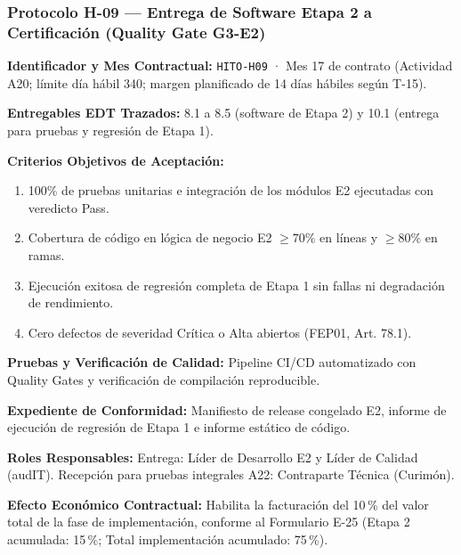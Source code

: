 \subsubsection*{Protocolo H-09 — Entrega de Software Etapa 2 a Certificación (Quality Gate G3-E2)}\label{sec:9-proto-h9}
\par\noindent\textbf{Identificador y Mes Contractual:} \texttt{HITO-H09} · Mes 17 de contrato (Actividad A20; límite día hábil 340; margen planificado de 14 días hábiles según T-15).\par
\par\noindent\textbf{Entregables EDT Trazados:} 8.1 a 8.5 (software de Etapa 2) y 10.1 (entrega para pruebas y regresión de Etapa 1).\par
\par\noindent\textbf{Criterios Objetivos de Aceptación:}
\begin{enumerate}
  \item 100\% de pruebas unitarias e integración de los módulos E2 ejecutadas con veredicto Pass.
  \item Cobertura de código en lógica de negocio E2 $\ge 70\%$ en líneas y $\ge 80\%$ en ramas.
  \item Ejecución exitosa de regresión completa de Etapa 1 sin fallas ni degradación de rendimiento.
  \item Cero defectos de severidad Crítica o Alta abiertos (FEP01, Art. 78.1).
\end{enumerate}
\par\noindent\textbf{Pruebas y Verificación de Calidad:} Pipeline CI/CD automatizado con Quality Gates y verificación de compilación reproducible.\par
\par\noindent\textbf{Expediente de Conformidad:} Manifiesto de release congelado E2, informe de ejecución de regresión de Etapa 1 e informe estático de código.\par
\par\noindent\textbf{Roles Responsables:} Entrega: Líder de Desarrollo E2 y Líder de Calidad (audIT). Recepción para pruebas integrales A22: Contraparte Técnica (Curimón).\par
\par\noindent\textbf{Efecto Económico Contractual:} Habilita la facturación del 10\,\% del valor total de la fase de implementación, conforme al Formulario E-25 (Etapa 2 acumulada: 15\,\%; Total implementación acumulado: 75\,\%).\par

